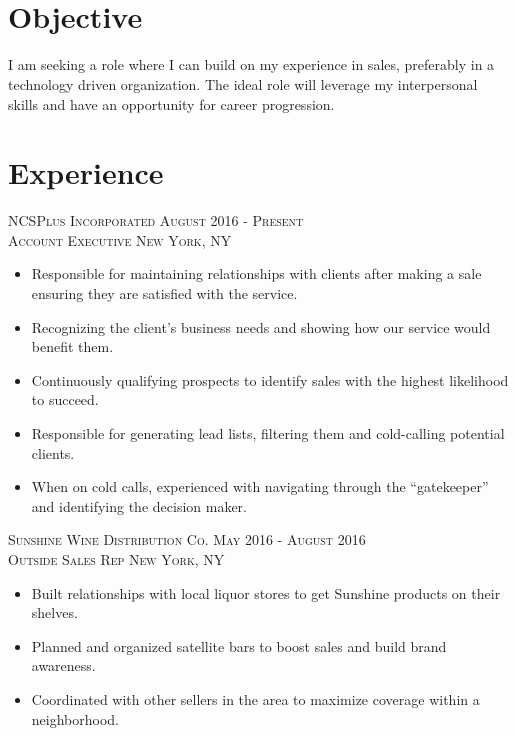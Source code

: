 \documentclass[oneside, final]{scrartcl}
\begin{document}
\begin{center}
 
\textsc{\LARGE{}}\\
\\



\section{Objective}
\begin{flushleft}
I am seeking a role where I can build on my experience in sales, preferably in a technology driven
organization. The ideal role will leverage my interpersonal skills and have an opportunity for career progression.
\end{flushleft}



\section{Experience}

\textsc{NCSPlus Incorporated \hfill August 2016 - Present \\}
\textsc{Account Executive \hfill New York, NY\\}
\begin{itemize}
	\setlength{\itemsep}{1pt}
	\setlength{\parskip}{0pt}
	\setlength{\parsep}{0pt}
	\setlength{\leftmargin}{-5mm}
    \item Responsible for maintaining relationships with clients after making a sale ensuring they are satisfied with the service.
    \item Recognizing the client's business needs and showing how our service would benefit them. 
    \item Continuously qualifying prospects to identify sales with the highest likelihood to succeed.
    \item Responsible for generating lead lists, filtering them and cold-calling potential clients.
    \item When on cold calls, experienced with navigating through the  ``gatekeeper'' and identifying the decision maker. 
\end{itemize}


\textsc{Sunshine Wine Distribution Co. \hfill May 2016 - August 2016 \\}
\textsc{Outside Sales Rep \hfill New York, NY\\}
\begin{itemize}
	\setlength{\itemsep}{1pt}
	\setlength{\parskip}{0pt}
	\setlength{\parsep}{0pt}
	\setlength{\leftmargin}{-5mm}
    \item Built relationships with local liquor stores to get Sunshine products on their shelves.
    \item Planned and organized satellite bars to boost sales and build brand awareness.
    \item Coordinated with other sellers in the area to maximize coverage within a neighborhood.
\end{itemize}


\end{center}
\end{document}
